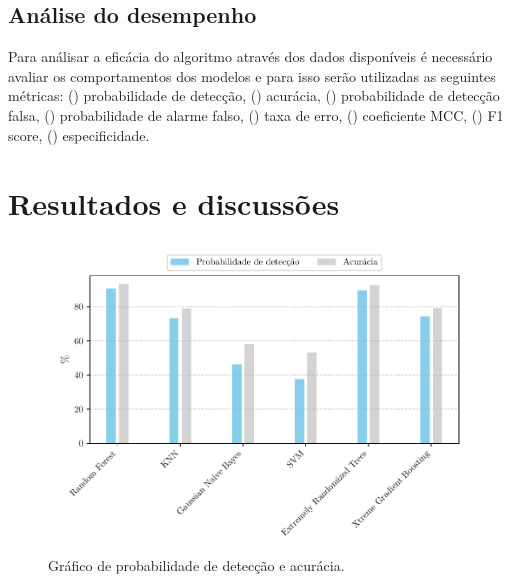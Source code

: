 \documentclass[12pt]{article}
\begin{document}
\subsection{Análise do desempenho}
Para análisar a eficácia do algoritmo através dos dados disponíveis é 
necessário avaliar os comportamentos dos modelos e para isso 
serão utilizadas as seguintes métricas:
() probabilidade de detecção,
() acurácia,
() probabilidade de detecção falsa,
() probabilidade de alarme falso,
() taxa de erro,
() coeficiente MCC,
() F1 score,
() especificidade.

\section{Resultados e discussões}

\begin{figure}[ht]
  \centering
  \includegraphics[width=1\linewidth]{../plot_accuracy_and_tpr.pdf}
  \caption{Gráfico de probabilidade de detecção e acurácia.}
\end{figure}
\end{document}
